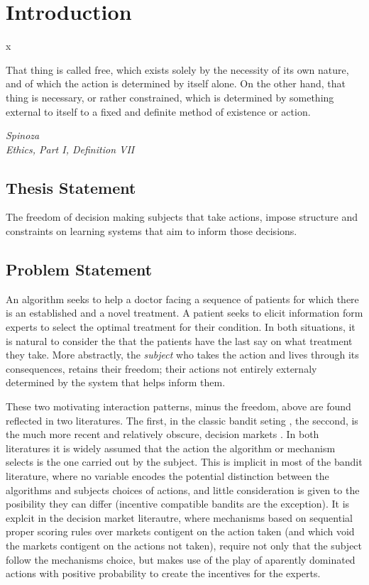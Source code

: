 \chapter{Introduction}x
\label{cha:intro}



\epigraph{
That thing is called free, which exists solely by the necessity of its own nature, and of which the action is determined by itself alone. On the other hand, that thing is necessary, or rather constrained, which is determined by something external to itself to a fixed and definite method of existence or action.}{\textit{Spinoza \\Ethics, Part I, Definition VII}}


\section{Thesis Statement}
\label{sec:thesisstatement}

The freedom of decision making subjects that take actions, impose structure and constraints on learning systems that aim to inform those decisions. 

\section{Problem Statement}
\label{sec:problemstatement}


An algorithm seeks to help a doctor facing a sequence of patients for which there is an established and a novel treatment. A patient seeks to elicit information form experts to select the optimal treatment for their condition. In both situations, it is natural to consider the  that the patients have the last say on what treatment they take. More abstractly, the \emph{subject} who takes the action and lives through its consequences, retains their freedom; their actions not entirely externaly determined by the system that helps inform them.

These two motivating interaction patterns, minus the freedom, above are found reflected in two literatures. The first, in the classic bandit seting \cite{thompson:33,gittins1979bandit,bubeck:12}, the seccond, is the much more recent and relatively obscure, decision markets \cite{berg2003prediction,hanson2002decision,othman2010decision,boutilier2012eliciting,chen2014eliciting}. In both literatures it is widely assumed that the action the algorithm or mechanism selects is the one carried out by the subject. This is implicit in most of the bandit literature, where no variable encodes the potential distinction between the algorithms and subjects choices of actions, and little consideration is given to the posibility they can differ (incentive compatible bandits are the exception). It is explcit in the decision market literautre, where mechanisms based on sequential proper scoring rules over markets contigent on the action taken (and which void the markets contigent on the actions not taken), require not only that the subject follow the mechanisms choice, but makes use of the play of aparently dominated actions with positive probability to create the incentives for the experts. 

